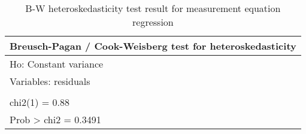 \clearpage
\begin{table}[htbp]
    \centering
    \caption{B-W heteroskedasticity test result for measurement equation regression}
    \begin{tabular}{llllll}
        \toprule
        \multicolumn{6}{c}{Breusch-Pagan / Cook-Weisberg test for heteroskedasticity } \\
        \midrule
        \multicolumn{6}{l}{         Ho: Constant variance}                             \\
        \multicolumn{6}{l}{         Variables: residuals}                              \\
        \multicolumn{6}{c}{}                                                           \\
        \multicolumn{6}{l}{         chi2(1)      =     0.88}                           \\
        \multicolumn{6}{l}{         Prob > chi2  =   0.3491}                           \\
        \bottomrule
    \end{tabular}%
    \label{bwtest}%
\end{table}%
\clearpage
